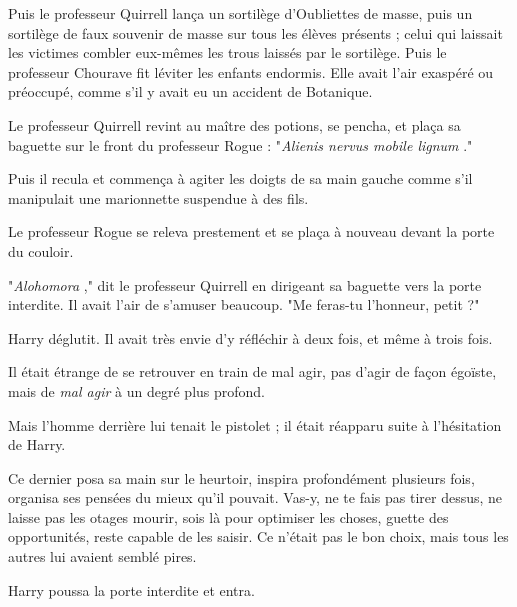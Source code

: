 Puis le professeur Quirrell lança un sortilège d'Oubliettes de masse, puis un sortilège de faux souvenir de masse sur tous les élèves présents ; celui qui laissait les victimes combler eux-mêmes les trous laissés par le sortilège. Puis le professeur Chourave fit léviter les enfants endormis. Elle avait l'air exaspéré ou préoccupé, comme s'il y avait eu un accident de Botanique.

Le professeur Quirrell revint au maître des potions, se pencha, et plaça sa baguette sur le front du professeur Rogue : "\emph{Alienis nervus mobile lignum} ."

Puis il recula et commença à agiter les doigts de sa main gauche comme s'il manipulait une marionnette suspendue à des fils.

Le professeur Rogue se releva prestement et se plaça à nouveau devant la porte du couloir.

"\emph{Alohomora} ," dit le professeur Quirrell en dirigeant sa baguette vers la porte interdite. Il avait l'air de s'amuser beaucoup. "Me feras-tu l'honneur, petit ?"

Harry déglutit. Il avait très envie d'y réfléchir à deux fois, et même à trois fois.

Il était étrange de se retrouver en train de mal agir, pas d'agir de façon égoïste, mais de \emph{mal agir}  à un degré plus profond.

Mais l'homme derrière lui tenait le pistolet ; il était réapparu suite à l'hésitation de Harry.

Ce dernier posa sa main sur le heurtoir, inspira profondément plusieurs fois, organisa ses pensées du mieux qu'il pouvait. Vas-y, ne te fais pas tirer dessus, ne laisse pas les otages mourir, sois là pour optimiser les choses, guette des opportunités, reste capable de les saisir. Ce n'était pas le bon choix, mais tous les autres lui avaient semblé pires.

Harry poussa la porte interdite et entra.

